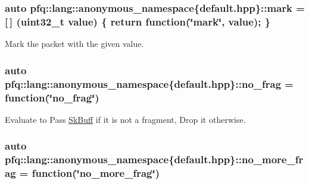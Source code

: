 \subsubsection[{\texorpdfstring{mark}{mark}}]{\setlength{\rightskip}{0pt plus 5cm}auto pfq\+::lang\+::anonymous\+\_\+namespace\{default.\+hpp\}\+::mark = \mbox{[}$\,$\mbox{]} (uint32\+\_\+t value) \{ return {\bf function}(\char`\"{}mark\char`\"{}, value); \}}\hypertarget{namespacepfq_1_1lang_1_1anonymous__namespace_02default_8hpp_03_a7b831baeabda070b89ca862a9445a4a8}{}\label{namespacepfq_1_1lang_1_1anonymous__namespace_02default_8hpp_03_a7b831baeabda070b89ca862a9445a4a8}


Mark the packet with the given value. 

\subsubsection[{\texorpdfstring{no\+\_\+frag}{no_frag}}]{\setlength{\rightskip}{0pt plus 5cm}auto pfq\+::lang\+::anonymous\+\_\+namespace\{default.\+hpp\}\+::no\+\_\+frag = {\bf function}(\char`\"{}no\+\_\+frag\char`\"{})}\hypertarget{namespacepfq_1_1lang_1_1anonymous__namespace_02default_8hpp_03_a4cfaf018f687a1563161b8f4245a6652}{}\label{namespacepfq_1_1lang_1_1anonymous__namespace_02default_8hpp_03_a4cfaf018f687a1563161b8f4245a6652}


Evaluate to {\ttfamily Pass} \hyperlink{structpfq_1_1lang_1_1SkBuff}{Sk\+Buff} if it is not a fragment, {\ttfamily Drop} it otherwise. 

\subsubsection[{\texorpdfstring{no\+\_\+more\+\_\+frag}{no_more_frag}}]{\setlength{\rightskip}{0pt plus 5cm}auto pfq\+::lang\+::anonymous\+\_\+namespace\{default.\+hpp\}\+::no\+\_\+more\+\_\+frag = {\bf function}(\char`\"{}no\+\_\+more\+\_\+frag\char`\"{})}\hypertarget{namespacepfq_1_1lang_1_1anonymous__namespace_02default_8hpp_03_a88628ce70e2a650af1338851373b9891}{}\label{namespacepfq_1_1lang_1_1anonymous__namespace_02default_8hpp_03_a88628ce70e2a650af1338851373b9891}


